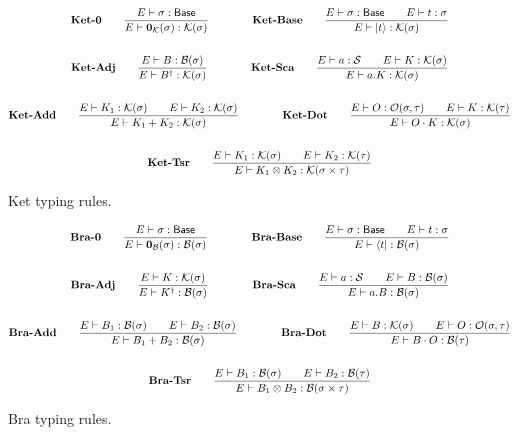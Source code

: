 \documentclass{article}
\begin{document}
\begin{figure}[h]
    \begin{gather*}
        \textbf{Ket-0} \qquad
        \frac{E \vdash \sigma : \mathsf{Base}}{E \vdash \mathbf{0}_\mathcal{K}(\sigma) : \mathcal{K}(\sigma)} 
        \qquad \qquad
        \textbf{Ket-Base} \qquad
        \frac{E \vdash \sigma : \mathsf{Base} \qquad E\vdash t : \sigma}{E \vdash \ket{t} : \mathcal{K}(\sigma)} \\
        \\
        \textbf{Ket-Adj} \qquad
        \frac{E \vdash B : \mathcal{B}(\sigma)}{E \vdash B^\dagger : \mathcal{K}(\sigma)} 
        \qquad \qquad
        \textbf{Ket-Sca} \qquad
        \frac{E \vdash a : \mathcal{S} \qquad E \vdash K : \mathcal{K}(\sigma)}{E \vdash a.K : \mathcal{K}(\sigma)} \\
        \\
        \textbf{Ket-Add} \qquad
        \frac{E \vdash K_1 : \mathcal{K}(\sigma) \qquad E \vdash K_2 : \mathcal{K}(\sigma)}{E \vdash K_1 + K_2 : \mathcal{K}(\sigma)}
        \qquad \qquad
        \textbf{Ket-Dot} \qquad
        \frac{E \vdash O : \mathcal{O}(\sigma, \tau) \qquad E \vdash K : \mathcal{K}(\tau)}{E \vdash O \cdot K : \mathcal{K}(\sigma)} \\
        \\
        \textbf{Ket-Tsr} \qquad
        \frac{E \vdash K_1 : \mathcal{K}(\sigma) \qquad E \vdash K_2 : \mathcal{K}(\tau)} {E \vdash K_1 \otimes K_2 : \mathcal{K}(\sigma \times \tau)}
    \end{gather*}
    \caption{Ket typing rules.}
\end{figure}

\begin{figure}[h]
    \begin{gather*}
        \textbf{Bra-0} \qquad
        \frac{E \vdash \sigma : \mathsf{Base}}{E \vdash \mathbf{0}_\mathcal{B}(\sigma) : \mathcal{B}(\sigma)} 
        \qquad \qquad
        \textbf{Bra-Base} \qquad
        \frac{E \vdash \sigma : \mathsf{Base} \qquad E\vdash t : \sigma}{E \vdash \bra{t} : \mathcal{B}(\sigma)} \\
        \\
        \textbf{Bra-Adj} \qquad
        \frac{E \vdash K : \mathcal{K}(\sigma)}{E \vdash K^\dagger : \mathcal{B}(\sigma)} 
        \qquad \qquad
        \textbf{Bra-Sca} \qquad
        \frac{E \vdash a : \mathcal{S} \qquad E \vdash B : \mathcal{B}(\sigma)}{E \vdash a.B : \mathcal{B}(\sigma)} \\
        \\
        \textbf{Bra-Add} \qquad
        \frac{E \vdash B_1 : \mathcal{B}(\sigma) \qquad E \vdash B_2 : \mathcal{B}(\sigma)}{E \vdash B_1 + B_2 : \mathcal{B}(\sigma)}
        \qquad \qquad
        \textbf{Bra-Dot} \qquad
        \frac{E \vdash B : \mathcal{K}(\sigma) \qquad E \vdash O : \mathcal{O}(\sigma, \tau)}{E \vdash B \cdot O : \mathcal{B}(\tau)} \\
        \\
        \textbf{Bra-Tsr} \qquad
        \frac{E \vdash B_1 : \mathcal{B}(\sigma) \qquad E \vdash B_2 : \mathcal{B}(\tau)} {E \vdash B_1 \otimes B_2 : \mathcal{B}(\sigma \times \tau)}
    \end{gather*}
    \caption{Bra typing rules.}
\end{figure}
\end{document}
